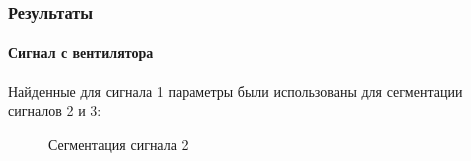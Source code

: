 \documentclass[9pt]{beamer}
\begin{document}
\begin{frame}\frametitle{Результаты}
\framesubtitle{Сигнал с вентилятора}
Найденные для сигнала 1 параметры были использованы для сегментации сигналов 2 и 3:
\begin{figure}[h]
\begin{minipage}[h]{0.49\linewidth}
\end{minipage}
\begin{minipage}[h]{0.49\linewidth}
\end{minipage}
\caption{Сегментация сигнала 2}
\end{figure}
\end{frame}
\end{document}

